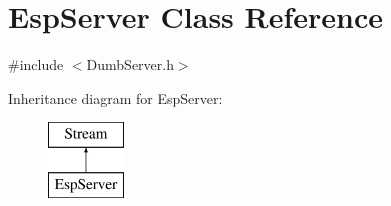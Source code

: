 \hypertarget{class_esp_server}{}\section{Esp\+Server Class Reference}
\label{class_esp_server}


{\ttfamily \#include $<$Dumb\+Server.\+h$>$}

Inheritance diagram for Esp\+Server\+:\begin{figure}[H]
\begin{center}
\leavevmode
\includegraphics[height=2.000000cm]{class_esp_server}
\end{center}
\end{figure}
